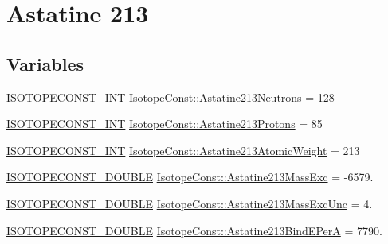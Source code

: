 \hypertarget{group___isotope_const-_astatine-_at213}{}\section{Astatine 213}
\label{group___isotope_const-_astatine-_at213}
\subsection*{Variables}
\begin{DoxyCompactItemize}
\item 
\mbox{\hyperlink{group___isotope_const-_macros_ga5f18360b3e99483a35c32d789e62621c}{I\+S\+O\+T\+O\+P\+E\+C\+O\+N\+S\+T\+\_\+\+I\+NT}} \mbox{\hyperlink{group___isotope_const-_astatine-_at213_ga4bda74973592c975144a2c3d34c1e63d}{Isotope\+Const\+::\+Astatine213\+Neutrons}} = 128
\item 
\mbox{\hyperlink{group___isotope_const-_macros_ga5f18360b3e99483a35c32d789e62621c}{I\+S\+O\+T\+O\+P\+E\+C\+O\+N\+S\+T\+\_\+\+I\+NT}} \mbox{\hyperlink{group___isotope_const-_astatine-_at213_ga9d15e5ecee3df899d88b6c785d43fa1e}{Isotope\+Const\+::\+Astatine213\+Protons}} = 85
\item 
\mbox{\hyperlink{group___isotope_const-_macros_ga5f18360b3e99483a35c32d789e62621c}{I\+S\+O\+T\+O\+P\+E\+C\+O\+N\+S\+T\+\_\+\+I\+NT}} \mbox{\hyperlink{group___isotope_const-_astatine-_at213_ga0c6b9fcad7d6a31eb6e63dac6ccd36b6}{Isotope\+Const\+::\+Astatine213\+Atomic\+Weight}} = 213
\item 
\mbox{\hyperlink{group___isotope_const-_macros_ga8f45a7272ce02c0b4c65c44636ed719a}{I\+S\+O\+T\+O\+P\+E\+C\+O\+N\+S\+T\+\_\+\+D\+O\+U\+B\+LE}} \mbox{\hyperlink{group___isotope_const-_astatine-_at213_ga7dea592f634bada2e31da2b286c00a4a}{Isotope\+Const\+::\+Astatine213\+Mass\+Exc}} = -\/6579.
\item 
\mbox{\hyperlink{group___isotope_const-_macros_ga8f45a7272ce02c0b4c65c44636ed719a}{I\+S\+O\+T\+O\+P\+E\+C\+O\+N\+S\+T\+\_\+\+D\+O\+U\+B\+LE}} \mbox{\hyperlink{group___isotope_const-_astatine-_at213_gae94319c85ced600ca4a82c6e0fb8f604}{Isotope\+Const\+::\+Astatine213\+Mass\+Exc\+Unc}} = 4.
\item 
\mbox{\hyperlink{group___isotope_const-_macros_ga8f45a7272ce02c0b4c65c44636ed719a}{I\+S\+O\+T\+O\+P\+E\+C\+O\+N\+S\+T\+\_\+\+D\+O\+U\+B\+LE}} \mbox{\hyperlink{group___isotope_const-_astatine-_at213_ga05d28b490d16c9f1291be70dd8ff22bc}{Isotope\+Const\+::\+Astatine213\+Bind\+E\+PerA}} = 7790.
\item 

\end{DoxyCompactItemize}
